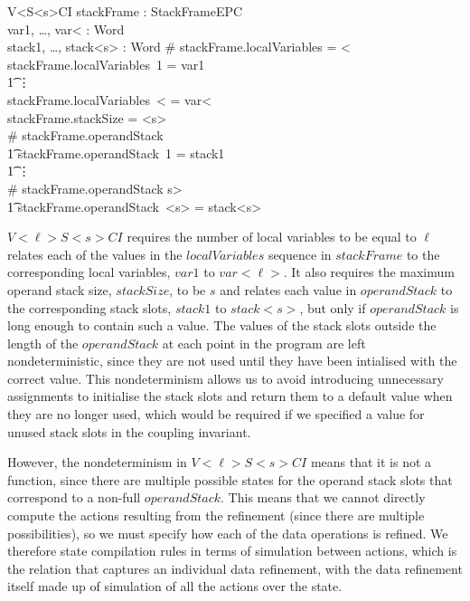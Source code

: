\begin{schema}{V{<}\ell{>}S{<}s{>}CI}
  stackFrame : StackFrameEPC \\
  var1, \ldots, var{<}\ell{>} : Word \\
  stack1, \ldots, stack{<}s{>} : Word
\where
  \# stackFrame.localVariables = {<}\ell{>} \\
  stackFrame.localVariables~1 = var1 \\
  \t1 \vdots \\
  stackFrame.localVariables~{<}\ell{>} = var{<}\ell{>} \\
  stackFrame.stackSize = {<}s{>} \\
  \# stackFrame.operandStack  \implies \\
  \t1 stackFrame.operandStack~1 = stack1 \\
  \t1 \vdots \\
  \# stackFrame.operandStack \geq {<}s{>} \implies \\
  \t1 stackFrame.operandStack~{<}s{>} = stack{<}s{>}
\end{schema}

$V{<}\ell{>}S{<}s{>}CI$ requires the number of local variables to be
equal to $\ell$ relates each of the values in the $localVariables$
sequence in $stackFrame$ to the corresponding local variables, $var1$
to $var{<}\ell{>}$.
It also requires the maximum operand stack size, $stackSize$, to be
$s$ and relates each value in $operandStack$ to the corresponding
stack slots, $stack1$ to $stack{<}s{>}$, but only if $operandStack$ is
long enough to contain such a value.
The values of the stack slots outside the length of the $operandStack$
at each point in the program are left nondeterministic, since they are
not used until they have been intialised with the correct value.
This nondeterminism allows us to avoid introducing unnecessary
assignments to initialise the stack slots and return them to a default
value when they are no longer used, which would be required if we
specified a value for unused stack slots in the coupling invariant.

However, the nondeterminism in $V{<}\ell{>}S{<}s{>}CI$ means that it
is not a function, since there are multiple possible states for the
operand stack slots that correspond to a non-full $operandStack$.
This means that we cannot directly compute the actions resulting from
the refinement (since there are multiple possibilities), so we must
specify how each of the data operations is refined.
We therefore state compilation rules in terms of \Circus{} simulation
between actions, which is the relation that captures an individual
data refinement, with the data refinement itself made up of simulation
of all the actions over the state.

